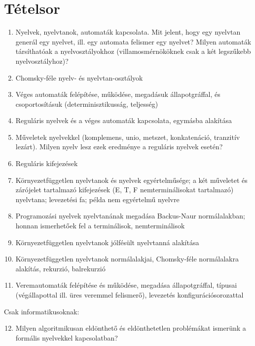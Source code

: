 \documentclass[a4paper]{article}
\begin{document}
\section{Tételsor}

\begin{enumerate}
    \item Nyelvek, nyelvtanok, automaták kapcsolata. Mit jelent, hogy
        egy nyelvtan generál egy nyelvet, ill. egy automata felismer egy
        nyelvet? Milyen automaták társíthatóak a nyelvosztályokhoz
        (villamosmérnököknek csak a két legszűkebb nyelvosztályhoz)?
    \item Chomsky-féle nyelv- és nyelvtan-osztályok
    \item Véges automaták felépítése, működése, megadásuk
        állapotgráffal, és csoportosításuk (determinisztikusság,
        teljesség)
    \item Reguláris nyelvek és a véges automaták kapcsolata, egymásba
        alakítása
    \item Műveletek nyelvekkel (komplemens, unio, metszet, konkatenáció,
        tranzitív lezárt). Milyen nyelv lesz ezek eredménye a reguláris
        nyelvek esetén?
    \item Reguláris kifejezések
    \item Környezetfüggetlen nyelvtanok és nyelvek egyértelműsége; a két
        műveletet és zárójelet tartalmazó kifejezések (E, T, F
        nemterminálisokat tartalmazó) nyelvtana; levezetési fa; példa
        nem egyértelmű nyelvre
    \item Programozási nyelvek nyelvtanának megadása Backus-Naur
        normálalakban; honnan ismerhetőek fel a terminálisok,
        nemterminálisok
    \item Környezetfüggetlen nyelvtanok jólfésült nyelvtanná alakítása
    \item Környezetfüggetlen nyelvtanok normálalakjai, Chomsky-féle
        normálalakra alakítás, rekurzió, balrekurzió
    \item Veremautomaták felépítése és működése, megadása
        állapotgráffal, típusai (végállapottal ill. üres veremmel
        felismerő), levezetés konfigurációsorozattal
\end{enumerate}

\hrulefill

Csak informatikusoknak:

\begin{enumerate}
    \setcounter{enumi}{11}
    \item Milyen algoritmikusan eldönthető és eldönthetetlen problémákat
        ismerünk a formális nyelvekkel kapcsolatban?
\end{enumerate}


\newpage
\tableofcontents
\end{document}
